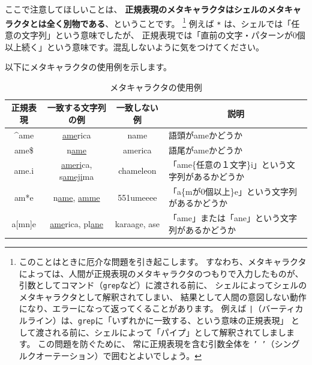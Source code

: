 \documentclass[a4j]{ltjsreport}
\begin{document}
    ここで注意してほしいことは、
    \textbf{正規表現のメタキャラクタはシェルのメタキャラクタとは全く別物である}、ということです。
    \footnote{このことはときに厄介な問題を引き起こします。
    すなわち、メタキャラクタによっては、人間が正規表現のメタキャラクタのつもりで入力したものが、
    引数としてコマンド（\texttt{grep}など）に渡される前に、
    シェルによってシェルのメタキャラクタとして解釈されてしまい、
    結果として人間の意図しない動作になり、エラーになって返ってくることがあります。
    例えば \texttt{|}（バーティカルライン）は、\texttt{grep}に「いずれかに一致する、という意味の正規表現」
    として渡される前に、シェルによって「パイプ」として解釈されてしまします。
    この問題を防ぐために、
    常に正規表現を含む引数全体を \texttt{'\,'}（シングルクオーテーション）で囲むとよいでしょう。} 
    例えば \texttt{*} は、シェルでは「任意の文字列」という意味でしたが、
    正規表現では「直前の文字・パターンが0個以上続く」という意味です。混乱しないように気をつけてください。

    以下にメタキャラクタの使用例を示します。

    \begin{table}[h]
        \begin{center}
            \begin{tabular}{|c|c|c|l|}
                \hline
                \multicolumn{1}{|c|}{\textbf{正規表現}}&\multicolumn{1}{|c|}{\textbf{一致する文字列の例}}&\multicolumn{1}{|c|}{\textbf{一致しない例}}&\multicolumn{1}{|c|}{\textbf{説明}}\\
                \hline
                \textasciicircum ame & \underline{ame}rica &  name &語頭がameかどうか\\
                \hline
                ame\$ & n\underline{ame} & america &語尾がameかどうか\\
                \hline
                ame.i & \underline{ameri}ca, s\underline{ameji}ma & chameleon&「ame\{任意の１文字\}i」という文字列があるかどうか\\
                \hline
                am*e & n\underline{ame}, \underline{amme} &  551umeeee&「a\{mが0個以上\}e」という文字列があるかどうか\\
                \hline
                a[mn]e & \underline{ame}rica, pl\underline{ane} & karaage, ase &「ame」または「ane」という文字列があるかどうか\\
                \hline
            \end{tabular}
        \end{center}
        \caption{メタキャラクタの使用例}
    \end{table}
\end{document}
